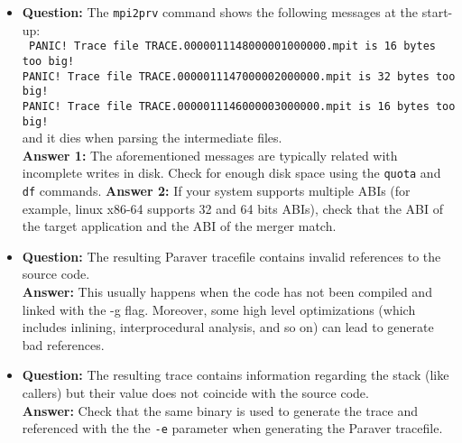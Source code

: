 \begin{itemize}

\item {\bf Question:} The {\tt mpi2prv} command shows the following messages at the start-up:\\
      {\tt
      PANIC! Trace file TRACE.0000011148000001000000.mpit is 16 bytes too big!\\
      PANIC! Trace file TRACE.0000011147000002000000.mpit is 32 bytes too big!\\
      PANIC! Trace file TRACE.0000011146000003000000.mpit is 16 bytes too big!\\
      }
      and it dies when parsing the intermediate files.\\
      {\bf Answer  1:} The aforementioned messages are typically related with incomplete writes in disk. Check for enough disk space using the {\tt quota} and {\tt df} commands.
      {\bf Answer  2:} If your system supports multiple ABIs (for example, linux x86-64 supports 32 and 64 bits ABIs), check that the ABI of the target application and the ABI of the merger match.

\item {\bf Question:} The resulting Paraver tracefile contains invalid references to the source code.\\
      {\bf Answer:  } This usually happens when the code has not been compiled and linked with the -g flag. Moreover, some high level optimizations (which includes inlining, interprocedural analysis, and so on) can lead to generate bad references.

\item {\bf Question:} The resulting trace contains information regarding the stack (like callers) but their value does not coincide with the source code.\\
      {\bf Answer:  } Check that the same binary is used to generate the trace and referenced with the the {\tt -e} parameter when generating the Paraver tracefile.

\end{itemize}
